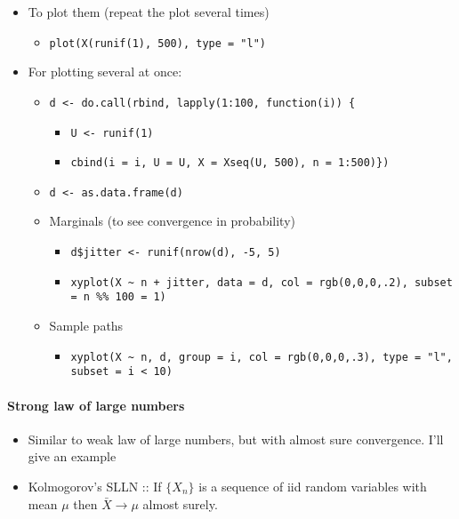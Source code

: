 \begin{itemize}
\begin{itemize}
\begin{itemize}
\end{itemize}
\item To plot them (repeat the plot several times)
\begin{itemize}
\item \texttt{plot(X(runif(1), 500), type = "l")}
\end{itemize}
\item For plotting several at once:
\begin{itemize}
\item \texttt{d <- do.call(rbind, lapply(1:100, function(i)) \{}
\begin{itemize}
\item \texttt{U <- runif(1)}
\item \texttt{cbind(i = i, U = U, X = Xseq(U, 500), n = 1:500)\})}
\end{itemize}
\item \texttt{d <- as.data.frame(d)}
\item Marginals (to see convergence in probability)
\begin{itemize}
\item \texttt{d\$jitter <- runif(nrow(d), -5, 5)}
\item \texttt{xyplot(X \textasciitilde{} n + jitter, data = d, col = rgb(0,0,0,.2), subset = n \%\% 100 = 1)}
\end{itemize}
\item Sample paths
\begin{itemize}
\item \texttt{xyplot(X \textasciitilde{} n, d, group = i, col = rgb(0,0,0,.3), type = "l", subset = i < 10)}
\end{itemize}
\end{itemize}
\end{itemize}
\end{itemize}

\paragraph{Strong law of large numbers}
\begin{itemize}
\item Similar to weak law of large numbers, but with almost sure
       convergence.  I'll give an example
\item Kolmogorov's SLLN :: If $\{X_n\}$ is a sequence of iid random
          variables with mean $\mu$ then $\bar X \to \mu$ almost
          surely.
\end{itemize}

